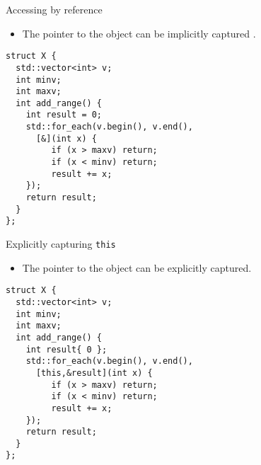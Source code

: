 \begin{frame}[t,fragile]{Accessing by reference}
  \begin{itemize}
    \item The pointer to the object can be implicitly captured .
  \end{itemize}
\pause
\begin{lstlisting}
struct X {
  std::vector<int> v;
  int minv;
  int maxv;
  int add_range() {
    int result = 0;
    std::for_each(v.begin(), v.end(), 
      [&](int x) {
         if (x > maxv) return;
         if (x < minv) return;
         result += x;
    });
    return result;
  }
};
\end{lstlisting}
\end{frame}

\begin{frame}[t,fragile]{Explicitly capturing \texttt{this}}
  \begin{itemize}
    \item The pointer to the object can be explicitly captured.
  \end{itemize}
\pause
\begin{lstlisting}
struct X {
  std::vector<int> v;
  int minv;
  int maxv;
  int add_range() {
    int result{ 0 };
    std::for_each(v.begin(), v.end(), 
      [this,&result](int x) {
         if (x > maxv) return;
         if (x < minv) return;
         result += x;
    });
    return result;
  }
};
\end{lstlisting}
\end{frame}


